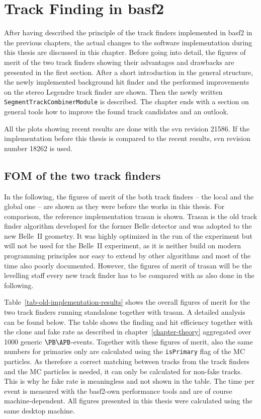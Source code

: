 \chapter{Track Finding in basf2} \label{chapter-workflow}

After having described the principle of the track finders implemented in basf2 in the previous chapters, the actual changes to the software implementation during this thesis are discussed in this chapter. Before going into detail, the figures of merit of the two track finders showing their advantages and drawbacks are presented in the first section. After a short introduction in the general structure, the newly implemented background hit finder and the performed improvements on the stereo Legendre track finder are shown. Then the newly written \texttt{SegmentTrackCombinerModule} is described. The chapter ends with a section on general tools how to improve the found track candidates and an outlook.

All the plots showing recent results are done with the svn revision 21586. If the implementation before this thesis is compared to the recent results, svn revision number 18262 is used.

\section{FOM of the two track finders} \label{section-fom}

In the following, the figures of merit of the both track finders -- the local and the global one -- are shown as they were before the works in this thesis. For comparison, the reference implementation trasan is shown. Trasan is the old track finder algorithm developed for the former Belle detector and was adopted to the new Belle~II geometry. It was highly optimized in the run of the experiment but will not be used for the Belle~II experiment, as it is neither build on modern programming principles nor easy to extend by other algorithms and most of the time also poorly documented. However, the figures of merit of trasan will be the levelling staff every new track finder has to be compared with as also done in the following.

Table~\ref{tab-old-implementation-results} shows the overall figures of merit for the two track finders running standalone together with trasan. A detailed analysis can be found below. The table shows the finding and hit efficiency together with the clone and fake rate as described in chapter~\ref{chapter-theory} aggregated over 1000 generic $\PB \APB$-events. Together with these figures of merit, also the same numbers for primaries only are calculated using the \verb+isPrimary+ flag of the MC particles. As therefore a correct matching between tracks from the track finders and the MC particles is needed, it can only be calculated for non-fake tracks. This is why he fake rate is meaningless and not shown in the table. The time per event is measured with the basf2-own performance tools and are of course machine-dependent. All figures presented in this thesis were calculated using the same desktop machine.

